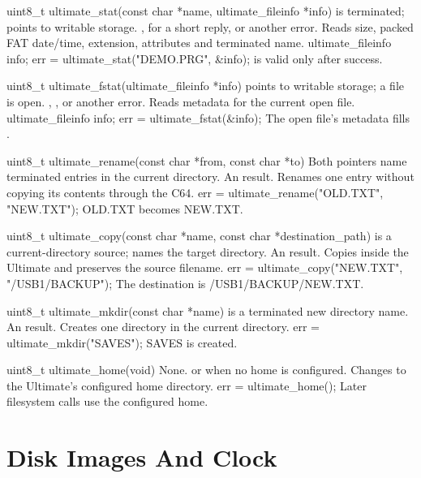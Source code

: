 \begin{referencechapter}
{uint8\_t ultimate\_stat(const char *name, ultimate\_fileinfo *info)}
{ is terminated;  points to writable
\hyperref[struct:ultimate-fileinfo]{} storage.}
{,  for a short reply, or
another error.}
{Reads size, packed FAT date/time, extension, attributes and terminated name.}
{ultimate\_fileinfo info; err = ultimate\_stat("DEMO.PRG", \&info);}
{ is valid only after success.}

{uint8\_t ultimate\_fstat(ultimate\_fileinfo *info)}
{ points to writable
\hyperref[struct:ultimate-fileinfo]{} storage; a file
is open.}
{, , or another error.}
{Reads metadata for the current open file.}
{ultimate\_fileinfo info; err = ultimate\_fstat(\&info);}
{The open file's metadata fills .}

{uint8\_t ultimate\_rename(const char *from, const char *to)}
{Both pointers name terminated entries in the current directory.}
{An  result.}
{Renames one entry without copying its contents through the C64.}
{err = ultimate\_rename("OLD.TXT", "NEW.TXT");}
{OLD.TXT becomes NEW.TXT.}

{uint8\_t ultimate\_copy(const char *name, const char *destination\_path)}
{ is a current-directory source;  names the
target directory.}
{An  result.}
{Copies inside the Ultimate and preserves the source filename.}
{err = ultimate\_copy("NEW.TXT", "/USB1/BACKUP");}
{The destination is /USB1/BACKUP/NEW.TXT.}

{uint8\_t ultimate\_mkdir(const char *name)}
{ is a terminated new directory name.}
{An  result.}
{Creates one directory in the current directory.}
{err = ultimate\_mkdir("SAVES");}
{SAVES is created.}

{uint8\_t ultimate\_home(void)}
{None.}
{ or  when no home is
configured.}
{Changes to the Ultimate's configured home directory.}
{err = ultimate\_home();}
{Later filesystem calls use the configured home.}

\section{Disk Images And Clock}


\end{referencechapter}
